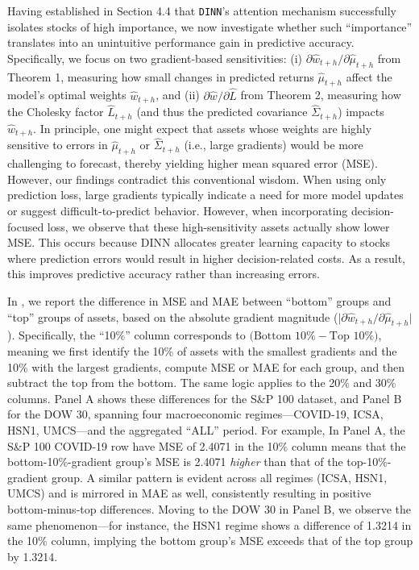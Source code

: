Having established in Section 4.4 that \texttt{DINN}’s attention mechanism successfully isolates stocks of high importance, we now investigate whether such “importance” translates into an unintuitive performance gain in predictive accuracy. Specifically, we focus on two gradient-based sensitivities: (i) $\partial \hat{w}_{t+h}/\partial \hat{\mu}_{t+h}$ from Theorem 1, measuring how small changes in predicted returns $\hat{\mu}_{t+h}$ affect the model’s optimal weights $\hat{w}_{t+h}$, and (ii) $\partial \hat{w}/\partial \hat{L}$ from Theorem 2, measuring how the Cholesky factor $\hat{L}_{t+h}$ (and thus the predicted covariance $\hat{\Sigma}_{t+h}$) impacts $\hat{w}_{t+h}$. In principle, one might expect that assets whose weights are highly sensitive to errors in $\hat{\mu}_{t+h}$ or $\hat{\Sigma}_{t+h}$ (i.e., large gradients) would be more challenging to forecast, thereby yielding higher mean squared error (MSE). However, our findings contradict this conventional wisdom. When using only prediction loss, large gradients typically indicate a need for more model updates or suggest difficult-to-predict behavior. However, when incorporating decision-focused loss, we observe that these high-sensitivity assets actually show lower MSE. This occurs because DINN allocates greater learning capacity to stocks where prediction errors would result in higher decision-related costs. As a result, this improves predictive accuracy rather than increasing errors.


In , we report the difference in MSE and MAE between “bottom” groups and “top” groups of assets, based on the absolute gradient magnitude ($\lvert\partial \hat{w}_{t+h}/\partial \hat{\mu}_{t+h}\rvert$). Specifically, the “10\%” column corresponds to $\bigr(\text{Bottom }10\% - \text{Top }10\%\bigr)$, meaning we first identify the 10\% of assets with the smallest gradients and the 10\% with the largest gradients, compute MSE or MAE for each group, and then subtract the top from the bottom. The same logic applies to the 20\% and 30\% columns. Panel A shows these differences for the S\&P 100 dataset, and Panel B for the DOW 30, spanning four macroeconomic regimes—COVID-19, ICSA, HSN1, UMCS—and the aggregated “ALL” period. For example, In Panel A, the S\&P 100 COVID-19 row have MSE of 2.4071 in the 10\% column means that the bottom-10\%-gradient group’s MSE is 2.4071 \emph{higher} than that of the top-10\%-gradient group. A similar pattern is evident across all regimes (ICSA, HSN1, UMCS) and is mirrored in MAE as well, consistently resulting in positive bottom-minus-top differences. Moving to the DOW 30 in Panel B, we observe the same phenomenon—for instance, the HSN1 regime shows a difference of 1.3214 in the 10\% column, implying the bottom group’s MSE exceeds that of the top group by 1.3214. 

